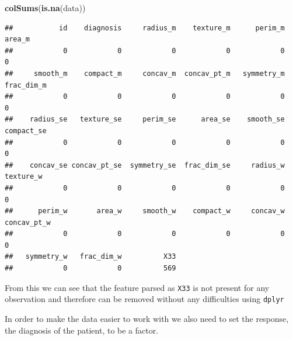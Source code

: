 \documentclass[]{article}
\newenvironment{Shaded}{\begin{snugshade}}{\end{snugshade}}
\newcommand{\KeywordTok}[1]{\textcolor[rgb]{0.13,0.29,0.53}{\textbf{#1}}}
\newcommand{\StringTok}[1]{\textcolor[rgb]{0.31,0.60,0.02}{#1}}
\newcommand{\OperatorTok}[1]{\textcolor[rgb]{0.81,0.36,0.00}{\textbf{#1}}}
\newcommand{\NormalTok}[1]{#1}
\begin{document}
\begin{Shaded}
\begin{Highlighting}[]
\KeywordTok{colSums}\NormalTok{(}\KeywordTok{is.na}\NormalTok{(data))}
\end{Highlighting}
\end{Shaded}

\begin{verbatim}
##           id    diagnosis     radius_m    texture_m      perim_m       area_m 
##            0            0            0            0            0            0 
##     smooth_m    compact_m     concav_m  concav_pt_m   symmetry_m   frac_dim_m 
##            0            0            0            0            0            0 
##    radius_se   texture_se     perim_se      area_se    smooth_se   compact_se 
##            0            0            0            0            0            0 
##    concav_se concav_pt_se  symmetry_se  frac_dim_se     radius_w    texture_w 
##            0            0            0            0            0            0 
##      perim_w       area_w     smooth_w    compact_w     concav_w  concav_pt_w 
##            0            0            0            0            0            0 
##   symmetry_w   frac_dim_w          X33 
##            0            0          569
\end{verbatim}

From this we can see that the feature parsed as \texttt{X33} is not
present for any observation and therefore can be removed without any
difficulties using \texttt{dplyr}

\begin{Shaded}
\end{Shaded}

In order to make the data easier to work with we also need to set the
response, the diagnosis of the patient, to be a factor.

\begin{Shaded}
\end{Shaded}
\end{document}
